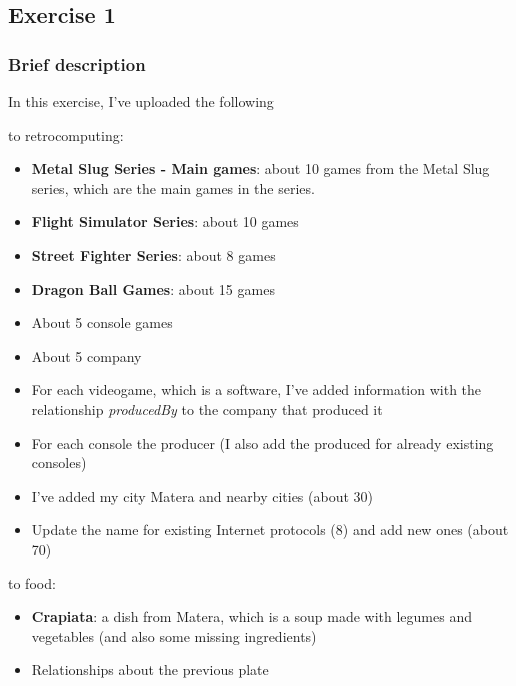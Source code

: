 \subsection{Exercise 1}

\subsubsection{Brief description}

In this exercise, I've uploaded the following 

to retrocomputing:
\begin{itemize}
    \item \textbf{Metal Slug Series - Main games}: about 10 games from the Metal Slug series, which are the main games in the series.
    \item \textbf{Flight Simulator Series}: about 10 games
    \item \textbf{Street Fighter Series}: about 8 games
    \item \textbf{Dragon Ball Games}: about 15 games
    \item About 5 console games
    \item About 5 company
    \item For each videogame, which is a software, I've added information with the relationship \textit{producedBy} to the company that produced it
    \item For each console the producer (I also add the produced for already existing consoles)
    \item I've added my city Matera and nearby cities (about 30)
    \item Update the name for existing Internet protocols (8) and add new ones (about 70)
\end{itemize}

to food:
\begin{itemize}
    \item \textbf{Crapiata}: a dish from Matera, which is a soup made with legumes and vegetables (and also some missing ingredients)
    \item Relationships about the previous plate
\end{itemize}




